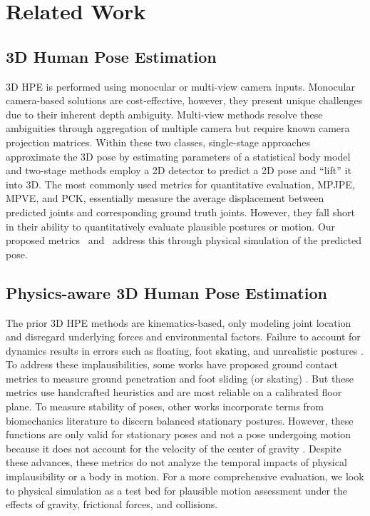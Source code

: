 \section{Related Work}
\subsection*{3D Human Pose Estimation}
3D HPE is performed using monocular \cite{kocabas2020vibe, ROMP, pavllo:videopose3d:2019} or multi-view \cite{remelli2020lightweight,pavlakos2017harvesting,iskakov2019learnable,qiu2019cross, zhang2021direct, tu2020voxelpose} camera inputs.
Monocular camera-based solutions are cost-effective, however, they present unique challenges due to their inherent depth ambiguity.
Multi-view methods resolve these ambiguities through aggregation of multiple camera but require known camera projection matrices.
%
Within these two classes, single-stage approaches approximate the 3D pose by estimating parameters of a statistical body model \cite{loper2015smpl, xu2020ghum, kocabas2020vibe} and two-stage methods \cite{pavllo:videopose3d:2019,zheng20213d,pavlakos2017harvesting} employ a 2D detector to predict a 2D pose and ``lift'' it into 3D.
%
The most commonly used metrics for quantitative evaluation, MPJPE, MPVE, and PCK, essentially measure the average displacement between predicted joints and corresponding ground truth joints. 
However, they fall short in their ability to quantitatively evaluate plausible postures or motion. Our proposed metrics \metricOne\ and \metricTwo\ address this through physical simulation of the predicted pose.

\subsection*{Physics-aware 3D Human Pose Estimation}
The prior 3D HPE methods are kinematics-based, only modeling joint location and disregard underlying forces and environmental factors. 
Failure to account for dynamics results in errors such as floating, foot skating, and unrealistic postures \cite{rempe2020contact}.
To address these implausibilities, some works have proposed ground contact metrics to measure ground penetration \cite{yuan2021simpoe, shimada2020physcap} and foot sliding (or skating) \cite{rempe2020contact, yuan2021simpoe}.
But these metrics use handcrafted heuristics and are most reliable on a calibrated floor plane.
To measure stability of poses, other works \cite{shimada2020physcap,tripathi20233d} incorporate terms from biomechanics literature \cite{hof2005condition,hof2007equations,winter1995human} to discern balanced stationary postures.
However, these functions are only valid for stationary poses and not a pose undergoing motion because it does not account for the velocity of the center of gravity \cite{hof2005condition}.
Despite these advances, these metrics do not analyze the temporal impacts of physical implausibility or a body in motion. For a more comprehensive evaluation, we look to physical simulation as a test bed for plausible motion assessment under the effects of gravity, frictional forces, and collisions.